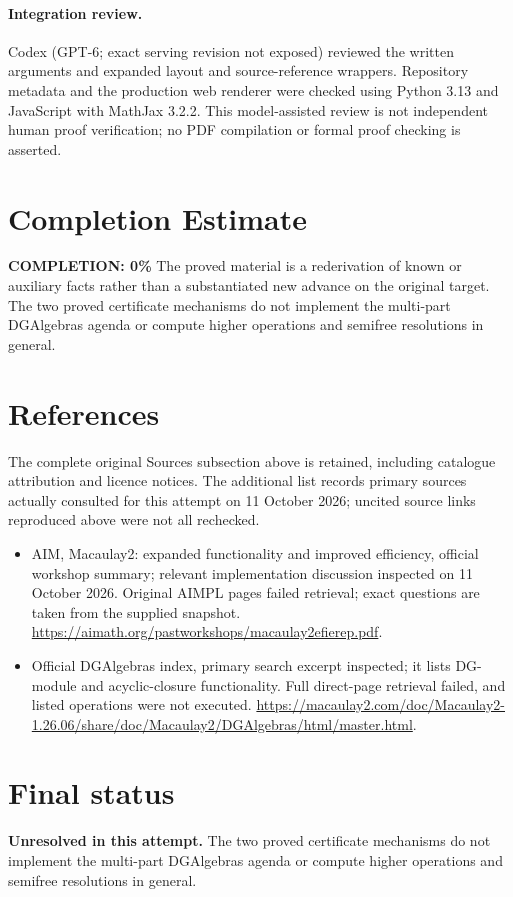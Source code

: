 \documentclass[11pt]{article}
\begin{document}
\paragraph{Integration review.} Codex (GPT-6; exact serving revision not exposed) reviewed the written arguments and expanded layout and source-reference wrappers. Repository metadata and the production web renderer were checked using Python 3.13 and JavaScript with MathJax 3.2.2. This model-assisted review is not independent human proof verification; no PDF compilation or formal proof checking is asserted.

\section{Completion Estimate}
\noindent\textbf{COMPLETION: 0\%}
The proved material is a rederivation of known or auxiliary facts rather than a substantiated new advance on the original target. The two proved certificate mechanisms do not implement the multi-part DGAlgebras agenda or compute higher operations and semifree resolutions in general.
\section{References}
The complete original Sources subsection above is retained, including catalogue attribution and licence notices. The additional list records primary sources actually consulted for this attempt on 11 October 2026; uncited source links reproduced above were not all rechecked.
\begin{itemize}
\item AIM, Macaulay2: expanded functionality and improved efficiency, official workshop summary; relevant implementation discussion inspected on 11 October 2026. Original AIMPL pages failed retrieval; exact questions are taken from the supplied snapshot. \url{https://aimath.org/pastworkshops/macaulay2efierep.pdf}.
\item Official DGAlgebras index, primary search excerpt inspected; it lists DG-module and acyclic-closure functionality. Full direct-page retrieval failed, and listed operations were not executed. \url{https://macaulay2.com/doc/Macaulay2-1.26.06/share/doc/Macaulay2/DGAlgebras/html/master.html}.
\end{itemize}
\section{Final status}
\textbf{Unresolved in this attempt.} The two proved certificate mechanisms do not implement the multi-part DGAlgebras agenda or compute higher operations and semifree resolutions in general.
\end{document}
